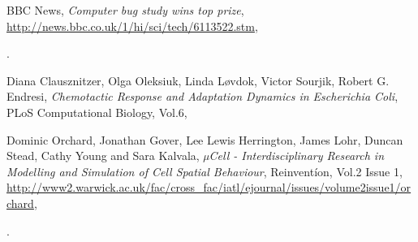 \documentclass[a4paper,onecolumn,oneside]{article}
\begin{document}
\begin{thebibliography}{9}

  BBC News,
  \emph{Computer bug study wins top prize},
  \url{http://news.bbc.co.uk/1/hi/sci/tech/6113522.stm},
  \date{3 November 2006}.

  Diana Clausznitzer, Olga Oleksiuk, Linda Løvdok, Victor Sourjik, Robert G. Endresi, 
  \emph{Chemotactic Response and Adaptation Dynamics in Escherichia Coli},
  PLoS Computational Biology, Vol.6,
  \date{May 2010}

  Dominic Orchard, Jonathan Gover, Lee Lewis Herrington, James Lohr, Duncan Stead, Cathy Young and Sara Kalvala,
  \emph{µCell - Interdisciplinary Research in Modelling and Simulation of Cell Spatial Behaviour},
  Reinvent\'{i}on, Vol.2 Issue 1, \url{http://www2.warwick.ac.uk/fac/cross_fac/iatl/ejournal/issues/volume2issue1/orchard}, \date{30 April 2009}.
  
\end{thebibliography}
\end{document}
